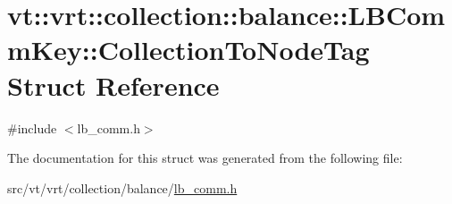 \hypertarget{structvt_1_1vrt_1_1collection_1_1balance_1_1_l_b_comm_key_1_1_collection_to_node_tag}{}\section{vt\+:\+:vrt\+:\+:collection\+:\+:balance\+:\+:L\+B\+Comm\+Key\+:\+:Collection\+To\+Node\+Tag Struct Reference}
\label{structvt_1_1vrt_1_1collection_1_1balance_1_1_l_b_comm_key_1_1_collection_to_node_tag}


{\ttfamily \#include $<$lb\+\_\+comm.\+h$>$}



The documentation for this struct was generated from the following file\+:\begin{DoxyCompactItemize}
\item 
src/vt/vrt/collection/balance/\hyperlink{lb__comm_8h}{lb\+\_\+comm.\+h}\end{DoxyCompactItemize}
